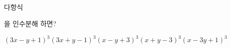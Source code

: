 다항식 \par\smallskip{}\par\smallskip\noindent 을 인수분해 하면?
\begin{choices32}{$(3x-y+1)^3$}{$(3x+y-1)^3$}{$(x-y+3)^3$}{$(x+y-3)^3$}{$(x-3y+1)^3$}\end{choices32}
